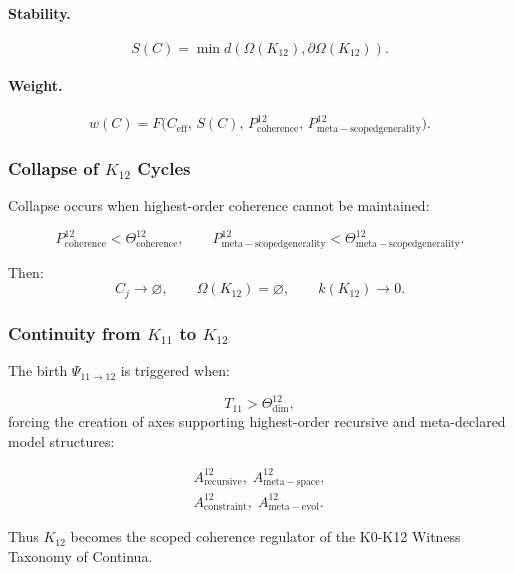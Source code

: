 \paragraph{Stability.}
\[
  S(C)=\min d(\Omega(K_{12}),\partial\Omega(K_{12})).
\]

\paragraph{Weight.}
\[
  w(C) = F\!\big(C_{\mathrm{eff}},\, S(C),\, P^{12}_{\mathrm{coherence}},\,
               P^{12}_{\mathrm{meta\!-\!scoped generality}} \big).
\]


\subsubsection{Collapse of $K_{12}$ Cycles}

Collapse occurs when highest-order coherence cannot be maintained:

\[
  P^{12}_{\mathrm{coherence}}<\Theta^{12}_{\mathrm{coherence}}, \qquad
  P^{12}_{\mathrm{meta\!-\!scoped generality}}<\Theta^{12}_{\mathrm{meta\!-\!scoped generality}}.
\]

Then:
\[
  C_j \to \varnothing,\qquad
  \Omega(K_{12}) = \varnothing,\qquad
  k(K_{12}) \to 0.
\]


\subsubsection{Continuity from $K_{11}$ to $K_{12}$}

The birth $\Psi_{11\to 12}$ is triggered when:

\[
  T_{11}>\Theta^{12}_{\mathrm{dim}},
\]
forcing the creation of axes supporting highest-order recursive and
meta-declared model structures:

\[
  \begin{aligned}
  A^{12}_{\mathrm{recursive}},\;
  A^{12}_{\mathrm{meta\!-\!space}},\\
  A^{12}_{\mathrm{constraint}},\;
  A^{12}_{\mathrm{meta\!-\!evol}}.
  \end{aligned}
\]

Thus $K_{12}$ becomes the scoped coherence regulator of the K0-K12 Witness Taxonomy of Continua.
